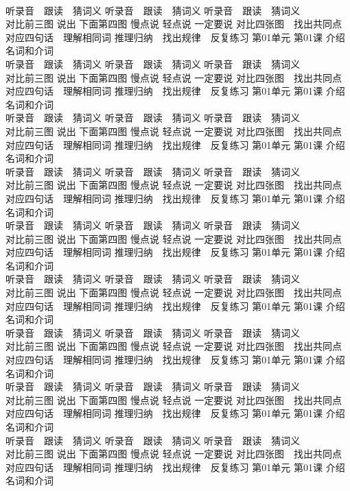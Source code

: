 \documentclass[8pt]{extreport}
\begin{document}
\begin{CJK}{UTF8}{min}
\\	听录音　跟读　猜词义 听录音　跟读　猜词义 听录音　跟读　猜词义 
\\	对比前三图 说出 下面第四图 慢点说 轻点说 一定要说	对比四张图　找出共同点 对应四句话　理解相同词 推理归纳　找出规律　反复练习 第01单元 第01课 介绍名词和介词
\\	听录音　跟读　猜词义 听录音　跟读　猜词义 听录音　跟读　猜词义 
\\	对比前三图 说出 下面第四图 慢点说 轻点说 一定要说	对比四张图　找出共同点 对应四句话　理解相同词 推理归纳　找出规律　反复练习 第01单元 第01课 介绍名词和介词
\\	听录音　跟读　猜词义 听录音　跟读　猜词义 听录音　跟读　猜词义 
\\	对比前三图 说出 下面第四图 慢点说 轻点说 一定要说	对比四张图　找出共同点 对应四句话　理解相同词 推理归纳　找出规律　反复练习 第01单元 第01课 介绍名词和介词
\\	听录音　跟读　猜词义 听录音　跟读　猜词义 听录音　跟读　猜词义 
\\	对比前三图 说出 下面第四图 慢点说 轻点说 一定要说	对比四张图　找出共同点 对应四句话　理解相同词 推理归纳　找出规律　反复练习 第01单元 第01课 介绍名词和介词
\\	听录音　跟读　猜词义 听录音　跟读　猜词义 听录音　跟读　猜词义 
\\	对比前三图 说出 下面第四图 慢点说 轻点说 一定要说	对比四张图　找出共同点 对应四句话　理解相同词 推理归纳　找出规律　反复练习 第01单元 第01课 介绍名词和介词
\\	听录音　跟读　猜词义 听录音　跟读　猜词义 听录音　跟读　猜词义 
\\	对比前三图 说出 下面第四图 慢点说 轻点说 一定要说	对比四张图　找出共同点 对应四句话　理解相同词 推理归纳　找出规律　反复练习 第01单元 第01课 介绍名词和介词
\\	听录音　跟读　猜词义 听录音　跟读　猜词义 听录音　跟读　猜词义 
\\	对比前三图 说出 下面第四图 慢点说 轻点说 一定要说	对比四张图　找出共同点 对应四句话　理解相同词 推理归纳　找出规律　反复练习 第01单元 第01课 介绍名词和介词
\\	听录音　跟读　猜词义 听录音　跟读　猜词义 听录音　跟读　猜词义 
\\	对比前三图 说出 下面第四图 慢点说 轻点说 一定要说	对比四张图　找出共同点 对应四句话　理解相同词 推理归纳　找出规律　反复练习 第01单元 第01课 介绍名词和介词
\\	听录音　跟读　猜词义 听录音　跟读　猜词义 听录音　跟读　猜词义 
\\	对比前三图 说出 下面第四图 慢点说 轻点说 一定要说	对比四张图　找出共同点 对应四句话　理解相同词 推理归纳　找出规律　反复练习 第01单元 第01课 介绍名词和介词

\end{CJK}
\end{document}
